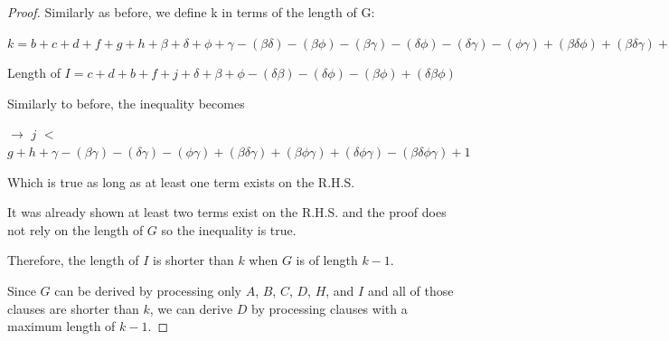 \documentclass[manuscript]{acmart}
\begin{document}
\begin{proof}
        Similarly as before, we define k in terms of the length of G:

        $k = b + c + d + f + g + h
            + \beta + \delta + \phi + \gamma
            - (\beta \delta) - (\beta \phi) - (\beta \gamma) - (\delta \phi) - (\delta \gamma) -(\phi \gamma)
            + (\beta \delta \phi) + (\beta \delta \gamma) + (\beta \phi \gamma) + (\delta \phi \gamma)
            - (\beta \delta \phi \gamma)
            + 1
        $

        Length of $I = c + d + b + f + j
        + \delta + \beta + \phi
        - (\delta \beta) - (\delta \phi) - (\beta \phi)
        + (\delta \beta \phi)
        $

        Similarly to before, the inequality becomes
        
        $\rightarrow$
        $j$
        $<$
        $g + h
            + \gamma
            - (\beta \gamma) - (\delta \gamma) -(\phi \gamma)
            + (\beta \delta \gamma) + (\beta \phi \gamma) + (\delta \phi \gamma)
            - (\beta \delta \phi \gamma)
            + 1
        $

        Which is true as long as at least one term exists on the R.H.S.

        It was already shown at least two terms exist on the R.H.S. and the proof does not rely on the length of $G$ so the inequality is true.

        Therefore, the length of $I$ is shorter than $k$ when $G$ is of length $k - 1$.

        Since $G$ can be derived by processing only $A$, $B$, $C$, $D$, $H$, and $I$ and all of those clauses are shorter than $k$, we can derive $D$ by processing clauses with a maximum length of $k - 1$.
    \end{proof}
\end{document}

